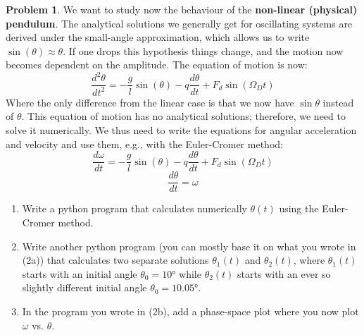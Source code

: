 \documentclass[10pt]{article}
\theoremstyle{definition}
\newtheorem{problem}{Problem}
\begin{document}
\begin{problem}
We want to study now the behaviour of the \textbf{non-linear (physical) pendulum}. The analytical solutions we
generally get for oscillating systems are derived under the small-angle approximation, which allows us to write
$\sin(\theta)\approx\theta$. If one drops this hypothesis things change, and the motion now becomes dependent on the amplitude.
The equation of motion is now:
$$\frac{d^2\theta}{dt^2}=-\frac{g}{l}\sin\left(\theta\right)-q\frac{d\theta}{dt}+F_d\sin\left(\Omega_Dt\right)$$
Where the only difference from the linear case is that we now have $\sin\theta$ instead of $\theta$. This equation of motion
has no analytical solutions; therefore, we need to solve it numerically. We thus need to write the equations
for angular acceleration and velocity and use them, e.g., with the Euler-Cromer method:
$$\frac{d\omega}{dt}=-\frac{g}{l}\sin\left(\theta\right)-q\frac{d\theta}{dt}+F_d\sin\left(\Omega_Dt\right)$$
$$\frac{d\theta}{dt}=\omega$$
\begin{enumerate}[label=(\alph*)]
      \item Write a python program that calculates numerically $\theta(t)$ using the Euler-Cromer method.
      \item Write another python program (you can mostly base it on what you wrote in (2a)) that calculates two separate
            solutions $\theta_1(t)$ and $\theta_2(t)$, where $\theta_1(t)$ starts with an initial angle $\theta_0=10\unit{\degree}$ while $\theta_2(t)$ starts with an ever so
            slightly different initial angle $\theta_0=10.05\unit{\degree}$.
      \item In the program you wrote in (2b), add a phase-space plot where you now plot $\omega$ vs. $\theta$.
\end{enumerate}
\end{problem}
\end{document}
